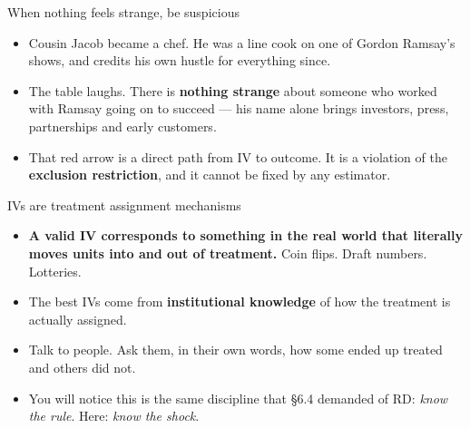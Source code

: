 \documentclass[
  11pt,
  ignorenonframetext,
  aspectratio=169,
]{beamer}
\providecommand{\tightlist}{%
  \setlength{\itemsep}{0pt}\setlength{\parskip}{0pt}}
\begin{document}
\begin{frame}{When nothing feels strange, be suspicious}
\protect{}\label{when-nothing-feels-strange-be-suspicious}
\begin{center}
\end{center}

\begin{itemize}
\tightlist
\item
  Cousin Jacob became a chef. He was a line cook on one of Gordon
  Ramsay's shows, and credits his own hustle for everything since.
\item
  The table laughs. There is \textbf{nothing strange} about someone who
  worked with Ramsay going on to succeed --- his name alone brings
  investors, press, partnerships and early customers.
\item
  That red arrow is a direct path from IV to outcome. It is a violation
  of the \textbf{exclusion restriction}, and it cannot be fixed by any
  estimator.
\end{itemize}
\end{frame}

\begin{frame}{IVs are treatment assignment mechanisms}
\protect{}\label{ivs-are-treatment-assignment-mechanisms}
\begin{itemize}
\tightlist
\item
  \textbf{A valid IV corresponds to something in the real world that
  literally moves units into and out of treatment.} Coin flips. Draft
  numbers. Lotteries.
\item
  The best IVs come from \textbf{institutional knowledge} of how the
  treatment is actually assigned.
\item
  Talk to people. Ask them, in their own words, how some ended up
  treated and others did not.
\item
  You will notice this is the same discipline that §6.4 demanded of RD:
  \emph{know the rule}. Here: \emph{know the shock}.
\end{itemize}
\end{frame}
\end{document}
